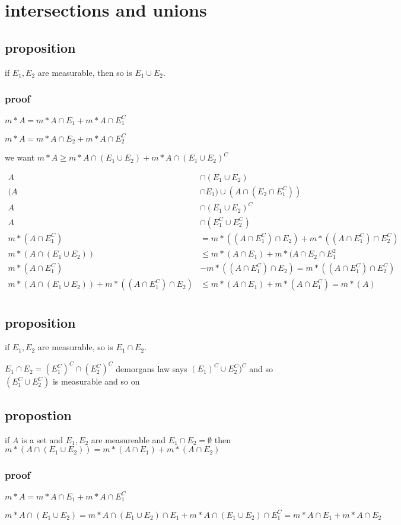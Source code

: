 \documentclass[letterpaper]{article}
\begin{document}
\section*{intersections and unions}
\subsection*{proposition}
if $E_1,E_2$ are measurable, then so is $E_1\cup E_2$.
\subsubsection*{proof}
$m*A=m*A\cap  E_1+m*A\cap E_1^C$

$m*A=m*A\cap  E_2+m*A\cap E_2^C$

we want
$m*A\ge m*A\cap  (E_1\cup E_2)+m*A\cap (E_1\cup E_2)^C$

\begin{align*}
  A&\cap(E_1\cup E_2)\\
  (A&\cap E_1)\cup (A\cap (E_2\cap E_1^C))\\
  A&\cap(E_1\cup E_2)^C\\
  A&\cap(E_1^C\cup E_2^C)\\
  m*(A\cap E_1^C)&=m*((A\cap E_1^C)\cap E_2)+m*((A\cap E_1^C)\cap E_2^C)\\
  m*(A\cap(E_1\cup E_2))&\le m*(A\cap E_1)+m*(A\cap E_2\cap E_1^2\\
  m*(A\cap E_1^C)&-m*((A\cap E_1^C)\cap E_2)=m*((A\cap E_1^C)\cap E_2^C)\\
  m*(A\cap(E_1\cup E_2))+m*((A\cap E_1^C)\cap E_2)&\le m*(A\cap E_1)+m*(A\cap E_1^C)=m*(A)\\
\end{align*}

\subsection*{proposition}
if $E_1, E_2$ are measurable, so is $E_1\cap E_2$.

$E_1\cap E_2=(E_1^C)^C\cap(E_2^C)^C$
demorgans law says $(E_1)^C\cup E_2^C)^C$ and so $(E_1^C\cup E_2^C)$ is measurable and so on

\subsection*{propostion}
if $A$ is a set and $E_1, E_2$ are measureable and $E_1\cap E_2=\emptyset$ then $m*(A\cap(E_1\cup E_2))=m*(A\cap E_1)+m*(A\cap E_2)$

\subsubsection*{proof}
$m*A=m*A\cap E_1+m*A\cap E_1^C$

$m*A\cap(E_1\cup E_2)=m*A\cap(E_1\cup E_2)\cap E_1+m*A\cap(E_1\cup E_2)\cap E_1^C=m*A\cap E_1+m*A\cap E_2$
\end{document}
